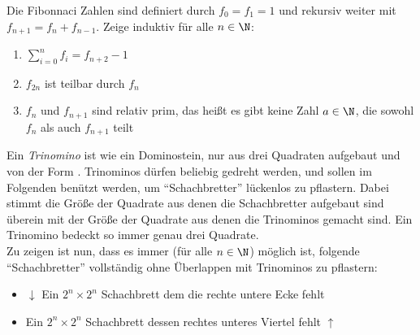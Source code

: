 \begin{exercise}
  Die Fibonnaci Zahlen sind definiert durch $f_0 = f_1 = 1$ und rekursiv
  weiter mit $f_{n+1} = f_n + f_{n-1}$. Zeige induktiv für alle $n \in \N$:
  \begin{enumerate}
  \item $\sum\limits_{ i= 0 }^{ n }{ f_i } = f_{n+2} - 1$
  \item $f_{2n}$ ist teilbar durch $f_n$
  \item $f_n$ und $f_{n+1}$ sind relativ prim, das heißt es gibt keine Zahl
    $a \in \N$, die sowohl $f_n$ als auch $f_{n+1}$ teilt
  \end{enumerate}
\end{exercise}

\begin{exercise}[Trinominos]
  Ein \emph{Trinomino} ist wie ein Dominostein, nur aus drei Quadraten aufgebaut
  und von der Form .
  Trinominos dürfen beliebig gedreht werden, und sollen im Folgenden benützt
  werden, um \enquote{Schachbretter} lückenlos zu pflastern. Dabei stimmt die
  Größe der Quadrate aus denen die Schachbretter aufgebaut sind überein mit der
  Größe der Quadrate aus denen die Trinominos gemacht sind. Ein Trinomino
  bedeckt so immer genau drei Quadrate.\\
  Zu zeigen ist nun, dass es immer (für alle $n \in \N$) möglich ist, folgende
  \enquote{Schachbretter} vollständig ohne Überlappen mit Trinominos zu
  pflastern:
  \begin{itemize}
  \item $\downarrow$ Ein $2^n \times 2^n$ Schachbrett dem die rechte untere
    Ecke fehlt
    \begin{figure}[!h]
      \centering
      \begin{minipage}[b]{0.38\textwidth}
        
      \end{minipage}
      \hspace{1cm}
      \begin{minipage}[b]{0.38\textwidth}
        
      \end{minipage}
    \end{figure}
  \item Ein $2^n \times 2^n$ Schachbrett dessen rechtes unteres Viertel fehlt
    $\uparrow$
  \end{itemize}
\end{exercise}

